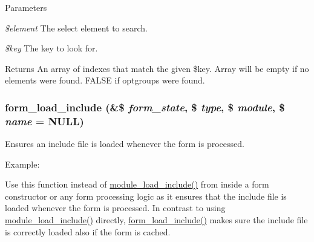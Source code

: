 \begin{DoxyParams}{Parameters}
\item[{\em \$element}]The select element to search. \item[{\em \$key}]The key to look for.\end{DoxyParams}
\begin{DoxyReturn}{Returns}
An array of indexes that match the given \$key. Array will be empty if no elements were found. FALSE if optgroups were found. 
\end{DoxyReturn}
\hypertarget{group__form__api_ga9c29fd030cf29d55e40f849de8dde040}{
\subsubsection[{form\_\-load\_\-include}]{\setlength{\rightskip}{0pt plus 5cm}form\_\-load\_\-include (\&\$ {\em form\_\-state}, \/  \$ {\em type}, \/  \$ {\em module}, \/  \$ {\em name} = {\ttfamily NULL})}}
\label{group__form__api_ga9c29fd030cf29d55e40f849de8dde040}
Ensures an include file is loaded whenever the form is processed.

Example: 


Use this function instead of \hyperlink{module_8inc_a49098ed4d33650ee5ab52aab40982423}{module\_\-load\_\-include()} from inside a form constructor or any form processing logic as it ensures that the include file is loaded whenever the form is processed. In contrast to using \hyperlink{module_8inc_a49098ed4d33650ee5ab52aab40982423}{module\_\-load\_\-include()} directly, \hyperlink{group__form__api_ga9c29fd030cf29d55e40f849de8dde040}{form\_\-load\_\-include()} makes sure the include file is correctly loaded also if the form is cached.


